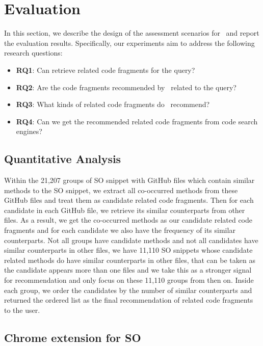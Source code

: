 \section{Evaluation}
\label{sec:eval}



In this section, we describe the design of the assessment scenarios for \tool\ and report the evaluation results. Specifically, our experiments aim to address the following research questions:
\begin{itemize}
	\item \textbf{RQ1}: Can {\tool} retrieve related code fragments for the query?
	\item \textbf{RQ2}: Are the code fragments recommended by \tool\ related to the query?
	\item \textbf{RQ3}: What kinds of related code fragments do \tool\ recommend?
	\item \textbf{RQ4}: Can we get the recommended related code fragments from code search engines?
\end{itemize}

\subsection{Quantitative Analysis}

Within the 21,207 groups of SO snippet with GitHub files which contain similar methods to the SO snippet, we extract all co-occurred methods from these GitHub files and treat them as candidate related code fragments. Then for each candidate in each GitHub file, we retrieve its similar counterparts from other files. As a result, we get the co-occurred methods as our candidate related code fragments and for each candidate we also have the frequency of its similar counterparts. Not all groups have candidate methods and not all candidates have similar counterparts in other files, we have 11,110 SO snippets whose candidate related methods do have similar counterparts in other files, that can be taken as the candidate appears more than one files and we take this as a stronger signal for recommendation and only focus on these 11,110 groups from then on. Inside each group, we order the candidates by the number of similar counterparts and returned the ordered list as the final recommendation of related code fragments to the user.


\subsection{Chrome extension for SO}




